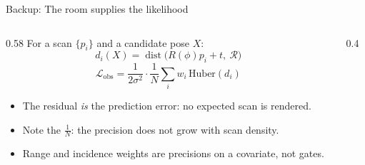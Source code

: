 \begin{frame}{Backup: The room supplies the likelihood}
  \begin{columns}[c]
    \begin{column}{0.58\textwidth}
      \small
      For a scan $\{p_i\}$ and a candidate pose $X$:
      \[
        d_i(X)=\operatorname{dist}\big(R(\phi)p_i+t,\ \mathcal R\big)
      \]
      \[
        \mathcal L_\text{obs}=\frac{1}{2\sigma^2}\cdot\frac1N\sum_i w_i\,\mathrm{Huber}(d_i)
      \]
      \begin{itemize}
        \item The residual \emph{is} the prediction error: no expected scan is rendered.
        \item Note the $\frac1N$: the precision does not grow with scan density.
        \item Range and incidence weights are precisions on a covariate, not gates.
      \end{itemize}
    \end{column}
    \begin{column}{0.4\textwidth}
      \centering
    \end{column}
  \end{columns}
\end{frame}

